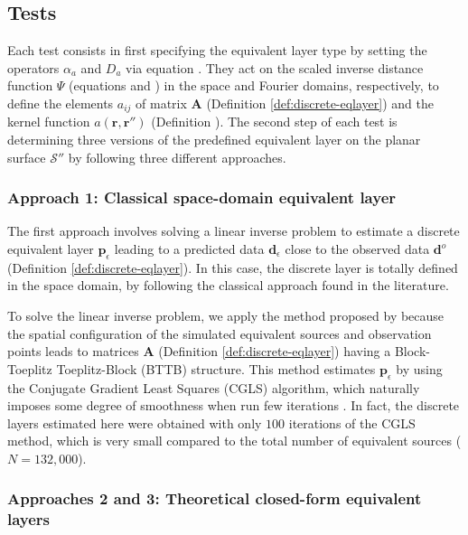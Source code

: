\subsection{Tests}

Each test consists in first specifying the equivalent layer type by setting the operators $\alpha_{a}$ and $D_{a}$ 
via equation .
They act on the scaled inverse distance function $\Psi$ 
(equations  and ) in the space and Fourier domains,
respectively, to define the elements $a_{ij}$ of matrix $\mathbf{A}$ (Definition \ref{def:discrete-eqlayer}) and 
the kernel function $a(\mathbf{r}, \mathbf{r}'')$ (Definition ).
The second step of each test is determining three versions of the predefined equivalent layer 
on the planar surface $\mathcal{S}''$ by following three different approaches.

\subsubsection{Approach 1: Classical space-domain equivalent layer}

The first approach involves solving a linear inverse problem to estimate a discrete 
equivalent layer $\mathbf{p}_{\epsilon}$ leading to a predicted data $\mathbf{d}_{\epsilon}$ 
close to the observed data $\mathbf{d}^{o}$ (Definition \ref{def:discrete-eqlayer}).
In this case, the discrete layer is totally defined in the space domain, by following the 
classical approach found in the literature.

To solve the linear inverse problem, we apply the method proposed by 
\citet{takahashi-etal2020, takahashi-etal2022} because the spatial configuration of the 
simulated equivalent sources and observation points leads to 
matrices $\mathbf{A}$ (Definition \ref{def:discrete-eqlayer}) having a Block-Toeplitz 
Toeplitz-Block (BTTB) structure.
This method estimates $\mathbf{p}_{\epsilon}$ by using the Conjugate Gradient Least Squares 
(CGLS) algorithm, which naturally imposes some degree of smoothness when run few iterations 
\citep[][ p. 166]{aster_etal2019}.
In fact, the discrete layers estimated here were obtained with only $100$ iterations of the 
CGLS method, which is very small compared to the total number of equivalent sources 
($N = 132,000$).

\subsubsection{Approaches 2 and 3: Theoretical closed-form equivalent layers}

